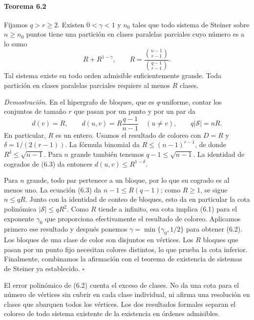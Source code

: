 \documentclass[spanish,11pt,a4paper]{article}
\begin{document}
\par
\begin{samepage}
\paragraph{Teorema 6.2}\label{teorema-6.2}

Fijamos \(q>r\ge2\). Existen \(0<\gamma<1\) y \(n_0\) tales que todo sistema de Steiner sobre \(n\ge n_0\) puntos tiene una partición en clases paralelas parciales cuyo número es a lo sumo \[R+R^{1-\gamma},\qquad
R=\frac{\binom{n-1}{r-1}}{\binom{q-1}{r-1}}.
\tag{6.2}\] Tal sistema existe en todo orden admisible suficientemente grande. Toda partición en clases paralelas parciales requiere al menos \(R\) clases.

\end{samepage}
\emph{Demostración.} En el hipergrafo de bloques, que es \(q\)-uniforme, contar los conjuntos de tamaño \(r\) que pasan por un punto y por un par da \[d(v)=R,\qquad
d(u,v)=R\frac{q-1}{n-1}\quad(u\ne v),\qquad
q|\mathcal S|=nR.
\tag{6.3}\] En particular, \(R\) es un entero. Usamos el resultado de coloreo con \(D=R\) y \(\delta=1/(2(r-1))\). La fórmula binomial da \(R\le(n-1)^{r-1}\), de donde \(R^\delta\le\sqrt{n-1}\). Para \(n\) grande también tenemos \(q-1\le\sqrt{n-1}\). La identidad de cogrados de (6.3) da entonces \(d(u,v)\le R^{1-\delta}\).

Para \(n\) grande, todo par pertenece a un bloque, por lo que su cogrado es al menos uno. La ecuación (6.3) da \(n-1\le R(q-1)\); como \(R\ge1\), se sigue \(n\le qR\). Junto con la identidad de conteo de bloques, esto da en particular la cota polinómica \(|\mathcal S|\le qR^2\). Como \(R\) tiende a infinito, esa cota implica (6.1) para el exponente \(\gamma_0\) que proporciona efectivamente el resultado de coloreo. Aplicamos primero ese resultado y después ponemos \(\gamma=\min\{\gamma_0,1/2\}\) para obtener (6.2). Los bloques de una clase de color son disjuntos en vértices. Los \(R\) bloques que pasan por un punto fijo necesitan colores distintos, lo que prueba la cota inferior. Finalmente, combinamos la afirmación con el teorema de existencia de sistemas de Steiner ya establecido. \(\square\)

El error polinómico de (6.2) cuenta el exceso de clases. No da una cota para el número de vértices sin cubrir en cada clase individual, ni afirma una resolución en clases que abarquen todos los vértices. Los dos resultados formales separan el coloreo de todo sistema existente de la existencia en órdenes admisibles.
\end{document}
